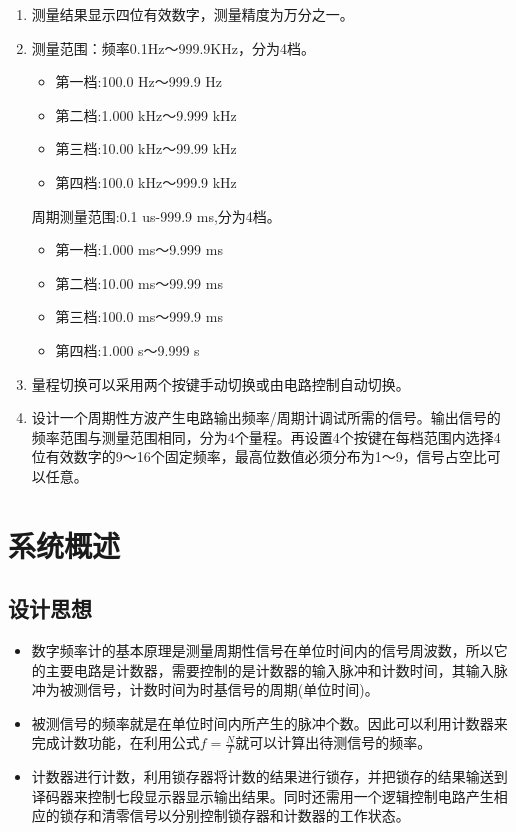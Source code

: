 \documentclass[12pt]{article}
\begin{document}
\begin{enumerate}
    \item 测量结果显示四位有效数字，测量精度为万分之一。
    \item 测量范围：频率0.1Hz～999.9KHz，分为4档。
          \begin{itemize}
              \item 第一档:100.0 Hz～999.9 Hz
              \item 第二档:1.000 kHz～9.999 kHz
              \item 第三档:10.00 kHz～99.99 kHz
              \item 第四档:100.0 kHz～999.9 kHz
          \end{itemize}


          周期测量范围:0.1 us-999.9 ms,分为4档。
          \begin{itemize}
              \item 第一档:1.000 ms～9.999 ms
              \item 第二档:10.00 ms～99.99 ms
              \item 第三档:100.0 ms～999.9 ms
              \item 第四档:1.000 s～9.999 s
          \end{itemize}


    \item 量程切换可以采用两个按键手动切换或由电路控制自动切换。
    \item 设计一个周期性方波产生电路输出频率/周期计调试所需的信号。输出信号的频率范围与测量范围相同，分为4个量程。再设置4个按键在每档范围内选择4位有效数字的9～16个固定频率，最高位数值必须分布为1～9，信号占空比可以任意。

\end{enumerate}

\section{系统概述}

\subsection{设计思想}

\begin{itemize}
    \item 数字频率计的基本原理是测量周期性信号在单位时间内的信号周波数，所以它的主要电路是计数器，需要控制的是计数器的输入脉冲和计数时间，其输入脉冲为被测信号，计数时间为时基信号的周期(单位时间)。
    \item 被测信号的频率就是在单位时间内所产生的脉冲个数。因此可以利用计数器来完成计数功能，在利用公式$f=\frac{N}{T}$就可以计算出待测信号的频率。
    \item 计数器进行计数，利用锁存器将计数的结果进行锁存，并把锁存的结果输送到译码器来控制七段显示器显示输出结果。同时还需用一个逻辑控制电路产生相应的锁存和清零信号以分别控制锁存器和计数器的工作状态。
\end{itemize}
\end{document}
